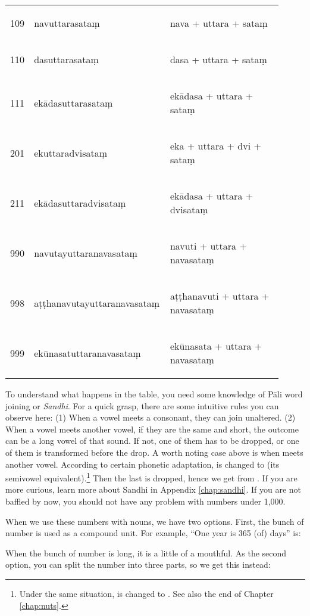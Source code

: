 \begin{longtable}[c]{@{}p{0.05\linewidth}%
	>{\itshape\raggedright\arraybackslash}p{0.45\linewidth}%
	>{\itshape\raggedright\arraybackslash}p{0.41\linewidth}@{}}
109 & navuttarasata\d m & nava + uttara + sata\d m \\
110 & dasuttarasata\d m & dasa + uttara + sata\d m \\
111 & ek\=adasuttarasata\d m & ek\=adasa + uttara + sata\d m \\
201 & ekuttaradvisata\d m & eka + uttara + dvi + sata\d m \\
211 & ek\=adasuttaradvisata\d m & ek\=adasa + uttara + dvisata\d m \\
990 & navutayuttaranavasata\d m & navuti + uttara + navasata\d m \\
998 & \mbox{a\d t\d thanavutayuttaranavasata\d m} & a\d t\d thanavuti + uttara + navasata\d m \\
999 & ek\=unasatuttaranavasata\d m & ek\=unasata + uttara + navasata\d m \\
\end{longtable}

To understand what happens in the table, you need some knowledge of P\=ali word joining or \emph{Sandhi}. For a quick grasp, there are some intuitive rules you can observe here: (1) When a vowel meets a consonant, they can join unaltered. (2) When a vowel meets another vowel, if they are the same and short, the outcome can be a long vowel of that sound. If not, one of them has to be dropped, or one of them is transformed before the drop. A worth noting case above is when  meets another vowel. According to certain phonetic adaptation,  is changed to  (its semivowel equivalent).\footnote{Under the same situation,  is changed to . See also the end of Chapter \ref{chap:nuts}.} Then the last  is dropped, hence we get  from . If you are more curious, learn more about Sandhi in Appendix \ref{chap:sandhi}. If you are not baffled by now, you should not have any problem with numbers under 1,000.

When we use these numbers with nouns, we have two options. First, the bunch of number is used as a compound unit. For example, ``One year is 365 (of) days'' is:


When the bunch of number is long, it is a little of a mouthful. As the second option, you can split the number into three parts, so we get this instead:


